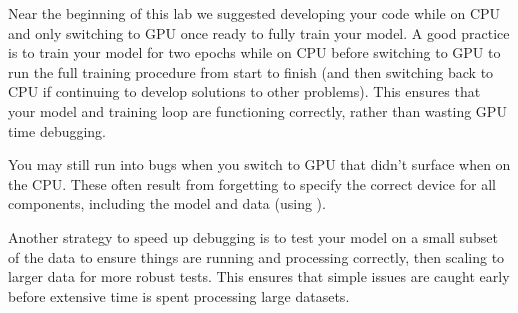 \begin{warn}
Near the beginning of this lab we suggested developing your code while on CPU and only switching to GPU once ready to fully train your model.
A good practice is to train your model for two epochs while on CPU before switching to GPU to run the full training procedure from start to finish (and then switching back to CPU if continuing to develop solutions to other problems).
This ensures that your model and training loop are functioning correctly, rather than wasting GPU time debugging.

You may still run into bugs when you switch to GPU that didn't surface when on the CPU.
These often result from forgetting to specify the correct device for all components, including the model and data (using ).

Another strategy to speed up debugging is to test your model on a small subset of the data to ensure things are running and processing correctly, then scaling to larger data for more robust tests.
This ensures that simple issues are caught early before extensive time is spent processing large datasets.
\end{warn}

